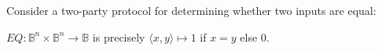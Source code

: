 Consider a two-party protocol for determining whether two inputs are equal:
\pause
\begin{example}[$Equality$]
\(EQ : \mathbb{B}^n \times \mathbb{B}^n \to \mathbb{B}\)
is precisely
\(\langle x, y \rangle \mapsto 1\)
if $x = y$ else 0.
\end{example}
